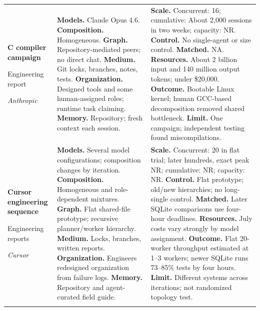 \begin{longtable}{@{}>{\raggedright\arraybackslash}p{}>{\raggedright\arraybackslash}p{}>{\raggedright\arraybackslash}p{}@{}}
\textbf{C compiler campaign}\par \citep{anthropic-c-compiler}\par Engineering report\par\emph{Anthropic} & \textbf{Models.} Claude Opus 4.6. \textbf{Composition.} Homogeneous. \textbf{Graph.} Repository-mediated peers; no direct chat. \textbf{Medium.} Git locks, branches, notes, tests. \textbf{Organization.} Designed tools and some human-assigned roles; runtime task claiming. \textbf{Memory.} Repository; fresh context each session. & \textbf{Scale.} Concurrent: 16; cumulative: About 2,000 sessions in two weeks; capacity: NR. \textbf{Control.} No single-agent or size control. \textbf{Matched.} NA. \textbf{Resources.} About 2 billion input and 140 million output tokens; under \$20,000. \textbf{Outcome.} Bootable Linux kernel; human GCC-based decomposition removed shared bottleneck. \textbf{Limit.} One campaign; independent testing found miscompilations. \\ \addlinespace[5pt]
\textbf{Cursor engineering sequence}\par \citep{cursor-scaling-long-running,cursor-self-driving,cursor-swarm-economics}\par Engineering reports\par\emph{Cursor} & \textbf{Models.} Several model configurations; composition changes by iteration. \textbf{Composition.} Homogeneous and role-dependent mixtures. \textbf{Graph.} Flat shared-file prototype; recursive planner/worker hierarchy. \textbf{Medium.} Locks, branches, written reports. \textbf{Organization.} Engineers redesigned organization from failure logs. \textbf{Memory.} Repository and agent-curated field guide. & \textbf{Scale.} Concurrent: 20 in flat trial; later hundreds, exact peak NR; cumulative: NR; capacity: NR. \textbf{Control.} Flat prototype; old/new hierarchies; no long-single control. \textbf{Matched.} Later SQLite comparisons use four-hour deadlines. \textbf{Resources.} July costs vary strongly by model assignment. \textbf{Outcome.} Flat 20-worker throughput estimated at 1--3 workers; newer SQLite runs 73--85\% tests by four hours. \textbf{Limit.} Different systems across iterations; not randomized topology test. \\ \addlinespace[5pt]

\end{longtable}
